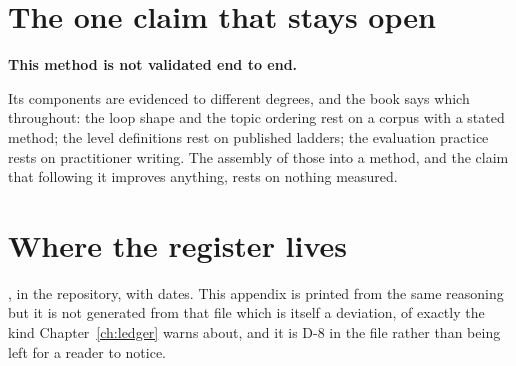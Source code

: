 \section{The one claim that stays open}

\textbf{This method is not validated end to end.}

Its components are evidenced to different degrees, and the book says which
throughout: the loop shape and the topic ordering rest on a corpus with a
stated method; the level definitions rest on published ladders; the evaluation
practice rests on practitioner writing. The assembly of those into a method,
and the claim that following it improves anything, rests on nothing measured.


\section{Where the register lives}

, in the repository, with dates. This appendix is printed
from the same reasoning but it is not generated from that file \dash{} which is
itself a deviation, of exactly the kind Chapter~\ref{ch:ledger} warns about,
and it is D-8 in the file rather than being left for a reader to notice.
